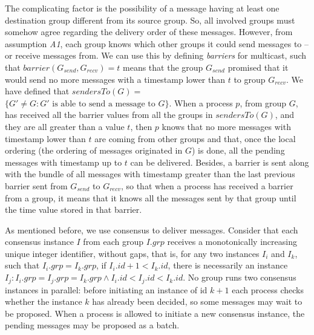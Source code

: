 \documentclass[times, 10pt]{article}
\begin{document}
The complicating factor is the possibility of a message having at least one destination group different from its source group. So, all involved groups must somehow agree regarding the delivery order of these messages. However, from assumption \emph{A1}, each group knows which other groups it could send messages to -- or receive messages from. We can use this by defining \emph{barriers} for multicast, such that \mbox{$barrier(G_{send},G_{recv}) = t$} means that the group $G_{send}$ promised that it would send no more messages with a timestamp lower than $t$ to group $G_{recv}$. We have defined that $sendersTo(G) =$ \mbox{$\{G' \neq G : G'\text{ is able to send a message to }G\}$}. When a process $p$, from group $G$, has received all the barrier values from all the groups in $sendersTo(G)$, and they are all greater than a value $t$, then $p$ knows that no more messages with timestamp lower than $t$ are coming from other groups and that, once the local ordering (the ordering of messages originated in $G$) is done, all the pending messages with timestamp up to $t$ can be delivered. Besides, a barrier is sent along with the bundle of all messages with timestamp greater than the last previous barrier sent from $G_{send}$ to $G_{recv}$, so that when a process has received a barrier from a group, it means that it knows all the messages sent by that group until the time value stored in that barrier.

As mentioned before, we use consensus to deliver messages. Consider that each consensus instance $I$ from each group $I.grp$ receives a monotonically increasing unique integer identifier, without gaps, that is, for any two instances $I_i$ and $I_k$, such that $I_i.grp = I_k.grp$, if $I_i.id + 1 < I_k.id$, there is necessarily an instance $I_j : I_i.grp = I_j.grp = I_k.grp \wedge I_i.id < I_j.id < I_k.id$. No group runs two consensus instances in parallel: before initiating an instance of id $k+1$ each process checks whether the instance $k$ has already been decided, so some messages may wait to be proposed. When a process is allowed to initiate a new consensus instance, the pending messages may be proposed as a batch.%
\end{document}
